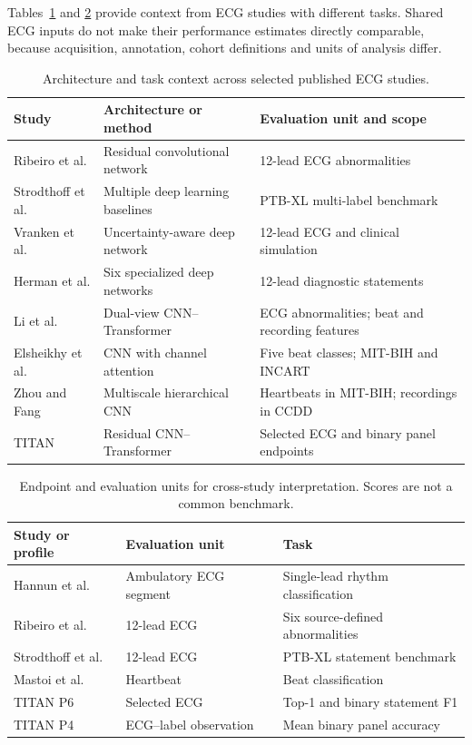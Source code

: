 \documentclass[life,article,submit,moreauthors]{Definitions/mdpi}
\begin{document}
Tables~\ref{tab:sota_results} and \ref{tab:sota_metrics_comparison} provide context from ECG studies with different tasks. Shared ECG inputs do not make their performance estimates directly comparable, because acquisition, annotation, cohort definitions and units of analysis differ.

\begin{table}[htbp]
\caption{Architecture and task context across selected published ECG studies.\label{tab:sota_results}}
\centering\small
\begin{tabular}{@{}p{.22\linewidth}p{.36\linewidth}p{.36\linewidth}@{}}
\toprule
Study & Architecture or method & Evaluation unit and scope \\
\midrule
Ribeiro et al. & Residual convolutional network & 12-lead ECG abnormalities \\
Strodthoff et al. & Multiple deep learning baselines & PTB-XL multi-label benchmark \\
Vranken et al. & Uncertainty-aware deep network & 12-lead ECG and clinical simulation \\
Herman et al. & Six specialized deep networks & 12-lead diagnostic statements \\
Li et al. & Dual-view CNN--Transformer & ECG abnormalities; beat and recording features \\
Elsheikhy et al. & CNN with channel attention & Five beat classes; MIT-BIH and INCART \\
Zhou and Fang & Multiscale hierarchical CNN & Heartbeats in MIT-BIH; recordings in CCDD \\
TITAN & Residual CNN--Transformer & Selected ECG and binary panel endpoints \\
\bottomrule
\end{tabular}
\end{table}

\begin{table}[htbp]
\caption{Endpoint and evaluation units for cross-study interpretation. Scores are not a common benchmark.\label{tab:sota_metrics_comparison}}
\centering\small
\begin{tabular}{@{}p{.24\linewidth}p{.26\linewidth}p{.43\linewidth}@{}}
\toprule
Study or profile & Evaluation unit & Task \\
\midrule
Hannun et al. & Ambulatory ECG segment & Single-lead rhythm classification \\
Ribeiro et al. & 12-lead ECG & Six source-defined abnormalities \\
Strodthoff et al. & 12-lead ECG & PTB-XL statement benchmark \\
Mastoi et al. & Heartbeat & Beat classification \\
TITAN P6 & Selected ECG & Top-1 and binary statement F1 \\
TITAN P4 & ECG--label observation & Mean binary panel accuracy \\
\bottomrule
\end{tabular}
\end{table}
\end{document}

